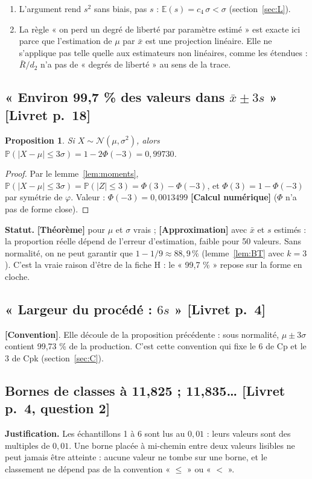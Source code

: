 \documentclass[11pt,a4paper]{article}
\theoremstyle{tq}
\newtheorem{prop}{Proposition}
\theoremstyle{remark}
\newcommand{\thm}{\textcolor{vertTQ}{\textbf{[Théorème]}}}
\newcommand{\conv}{\textcolor{orangeTQ}{\textbf{[Convention]}}}
\newcommand{\appr}{\textcolor{uimmred}{\textbf{[Approximation]}}}
\newcommand{\num}{\textcolor{uimmblue}{\textbf{[Calcul numérique]}}}
\newcommand{\liv}[1]{\textcolor{uimmblue}{\small[Livret p.~#1]}}
\newcommand{\E}{\mathbb{E}}
\renewcommand{\P}{\mathbb{P}}
\newcommand{\N}{\mathcal{N}}
\newcommand{\Rb}{\bar{R}}
\begin{document}
\begin{alerte}
\begin{enumerate}[nosep,leftmargin=1.2em]
\item L'argument rend $s^2$ sans biais, pas $s$ : $\E(s)=c_4\,\sigma<\sigma$ (section~\ref{sec:L}).
\item La règle « on perd un degré de liberté par paramètre estimé » est exacte ici parce que l'estimation de $\mu$ par $\bar x$ est une projection linéaire. Elle ne s'applique pas telle quelle aux estimateurs non linéaires, comme les étendues : $\Rb/d_2$ n'a pas de « degrés de liberté » au sens de la trace.
\end{enumerate}
\end{alerte}

\subsection{« Environ 99,7 \% des valeurs dans $\bar x\pm3s$ » \liv{18}}
\begin{prop}
Si $X\sim\N(\mu,\sigma^2)$, alors $\P(|X-\mu|\le3\sigma)=1-2\Phi(-3)=0{,}99730$.
\end{prop}
\begin{proof}
Par le lemme~\ref{lem:moments}, $\P(|X-\mu|\le3\sigma)=\P(|Z|\le3)=\Phi(3)-\Phi(-3)$, et $\Phi(3)=1-\Phi(-3)$ par symétrie de $\varphi$. Valeur : $\Phi(-3)=0{,}0013499$ \num{} ($\Phi$ n'a pas de forme close).
\end{proof}
\textbf{Statut.} \thm{} pour $\mu$ et $\sigma$ vrais ; \appr{} avec $\bar x$ et $s$ estimés : la proportion réelle dépend de l'erreur d'estimation, faible pour 50 valeurs. Sans normalité, on ne peut garantir que $1-1/9\approx88{,}9\,\%$ (lemme~\ref{lem:BT} avec $k=3$). C'est la vraie raison d'être de la fiche H : le « 99,7 \% » repose sur la forme en cloche.

\subsection{« Largeur du procédé : $6s$ » \liv{4}}
\conv{}. Elle découle de la proposition précédente : sous normalité, $\mu\pm3\sigma$ contient 99,73 \% de la production. C'est cette convention qui fixe le $6$ de Cp et le $3$ de Cpk (section~\ref{sec:C}).

\subsection{Bornes de classes à 11,825 ; 11,835… \liv{4, question 2}}
\textbf{Justification.} Les échantillons 1 à 6 sont lus au $0{,}01$ : leurs valeurs sont des multiples de $0{,}01$. Une borne placée à mi-chemin entre deux valeurs lisibles ne peut jamais être atteinte : aucune valeur ne tombe sur une borne, et le classement ne dépend pas de la convention « $\le$ » ou « $<$ ».
\end{document}
